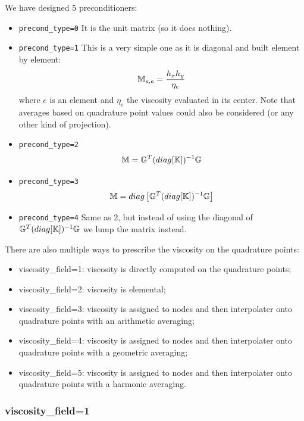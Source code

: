 We have designed 5 preconditioners:
\begin{itemize}
\item {\tt precond\_type=0} It is the unit matrix (so it does nothing). 
\item {\tt precond\_type=1} This is a very simple one as it is
diagonal and built element by element:
\[
{\mathbb{M}}_{e,e} = \frac{h_x h_y}{\eta_e} 
\]
where $e$ is an element and $\eta_e$ the viscosity evaluated in its center. Note that 
averages based on quadrature point values could also be considered (or any other kind of projection).
\item {\tt precond\_type=2}
\[
{{\mathbb{M}}} = {\mathbb{G}}^T (diag [{\mathbb{K}}]  )^{-1} {\mathbb{G}} 
\]
\item {\tt precond\_type=3} 
\[
{{\mathbb{M}}} = diag \left[ {\mathbb{G}}^T (diag [{\mathbb{K}}]  )^{-1} {\mathbb{G}} \right]
\]
\item {\tt precond\_type=4} Same as 2, but instead of using the 
diagonal of $ {\mathbb{G}}^T (diag [{\mathbb{K}}]  )^{-1} {\mathbb{G}}$ we lump the matrix instead.

\end{itemize}

There are also multiple ways to prescribe the viscosity on the 
quadrature points:
\begin{itemize}
\item {\python viscosity\_field=1}: viscosity is directly computed 
on the quadrature points;
\item {\python viscosity\_field=2}: viscosity is elemental;
\item {\python viscosity\_field=3}: viscosity is assigned to nodes and then 
interpolater onto quadrature points with an arithmetic averaging;
\item {\python viscosity\_field=4}: viscosity is assigned to nodes and then 
interpolater onto quadrature points with a geometric averaging;
\item {\python viscosity\_field=5}: viscosity is assigned to nodes and then 
interpolater onto quadrature points with a harmonic averaging.
\end{itemize}

\newpage







\newpage
\subsubsection{viscosity\_field=1}

